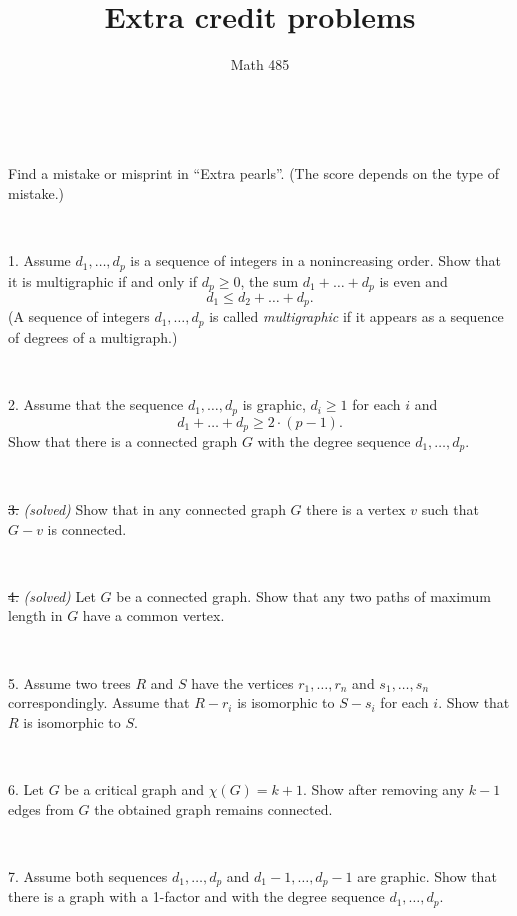 \documentclass[oneside,a4paper]{article}
\begin{document}
%
\title{Extra credit problems}
\author{Math 485}
\date{}
\maketitle

\textit{}

\ 

 Find a mistake or misprint in ``Extra pearls''.
(The score depends on the type of mistake.)


\ 

\noindent %
{1.} %
Assume $d_1,\dots, d_p$ is a sequence of integers in a nonincreasing order.
Show that it is multigraphic if and only if $d_p\ge0$, the sum $d_1+\dots+ d_p$ is even and 
\[d_1\le d_2+\dots+d_p.\]
(A sequence of integers $d_1,\dots, d_p$ is called \textit{multigraphic} if it appears as a sequence of degrees of a multigraph.)

\ 

\noindent %
{2.} %
Assume that the sequence $d_1,\dots, d_p$ is graphic,
$d_i\ge 1$ for each $i$ and 
\[d_1+\dots+d_p\ge 2\cdot(p-1).\]
Show that there is a connected graph $G$ with the degree sequence $d_1,\dots, d_p$.


\ 

\noindent \sout
{3.} \textit{(solved)} 
Show that in any connected graph $G$ there is a vertex $v$ such that $G-v$ is connected.

\ 


\noindent \sout
{4.} \textit{(solved)} 
Let $G$ be a  connected graph.
Show that any two paths of maximum length in $G$ have a common vertex.

\ 

\noindent %
{5.} %
Assume two trees $R$ and $S$ 
have the vertices $r_1,\dots,r_n$ and $s_1,\dots,s_n$ correspondingly.
Assume that $R-r_i$ is isomorphic to $S-s_i$ for each $i$.
Show that $R$ is isomorphic to $S$.

\ 

\noindent %
{6.} %
Let $G$ be a critical graph and $\chi(G)=k+1$.
Show after removing any $k-1$ edges from $G$  
the obtained graph remains connected. 


\ 

\noindent %
{7.} %
Assume both sequences $d_1,\dots, d_p$
 and $d_1-1,\dots, d_p-1$ are graphic.
Show that there is a graph with a 1-factor and with the degree sequence $d_1,\dots, d_p$.
\end{document}
